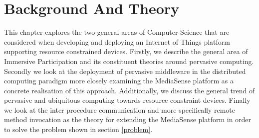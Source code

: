 \chapter{Background And Theory}
This chapter explores the two general areas of Computer Science that are considered when developing and deploying an Internet of Things platform supporting resource constrained devices. Firstly, we describe the general area of Immersive Participation and its constituent theories around pervasive computing. Secondly we look at the deployment of pervasive middleware in the distributed computing paradigm more closely examining the MediaSense platform as a concrete realisation of this approach. Additionally, we discuss the general trend of pervasive and ubiquitous computing towards resource constraint devices. Finally we look at the inter procedure communication and more specifically remote method invocation as the theory for extending the MediaSense platform in order to solve the problem shown in section \ref{problem}. 








